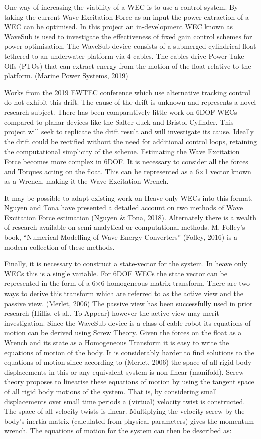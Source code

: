 \documentclass{report}
\begin{document}
One way of increasing the viability of a WEC is to use a control system. By taking the current Wave Excitation Force as an input the power extraction of a WEC can be optimised. In this project an in-development WEC known as WaveSub is used to investigate  the effectiveness of fixed gain control schemes for power optimisation.
The WaveSub device consists of a submerged cylindrical float tethered to an underwater platform via 4 cables. The cables drive Power Take Offs (PTOs) that can extract energy from the motion of the float relative to the platform. (Marine Power Systems, 2019)



Works from the 2019 EWTEC conference which use alternative tracking control do not exhibit this drift. The cause of the drift is unknown and represents a novel research subject. There has been comparatively little work on 6DOF WECs compared to planar devices like the Salter duck and Bristol Cylinder. This project will seek to replicate the drift result and will investigate its cause. Ideally the drift could be rectified without the need for additional control loops, retaining the computational simplicity of the scheme. Estimating the Wave Excitation Force becomes more complex in 6DOF. It is necessary to consider all the forces and Torques acting on the float. This can be represented as a 6×1 vector known as a Wrench, making it the Wave Excitation Wrench.

It may be possible to adapt existing work on Heave only WECs into this format. Nguyen and Tona have presented a detailed account on two methods of Wave Excitation Force estimation (Nguyen \& Tona, 2018). Alternately there is a wealth of research available on semi-analytical or computational methods. M. Folley’s book, “Numerical Modelling of Wave Energy Converters” (Folley, 2016) is a modern collection of these methods.

Finally, it is necessary to construct a state-vector for the system. In heave only WECs this is a single variable. For 6DOF WECs the state vector can be represented in the form of a 6×6 homogeneous matrix transform. There are two ways to derive this transform which are referred to as the active view and the passive view. (Merlet, 2006)
 The passive view has been successfully used in prior research (Hillis, et al., To Appear) however the active view may merit investigation. Since the WaveSub device is a class of cable robot its equations of motion can be derived using Screw Theory.
Given the forces on the float as a Wrench and its state as a Homogeneous Transform it is easy to write the equations of motion of the body. It is considerably harder to find solutions to the equations of motion since according to (Merlet, 2006) the space of all rigid body displacements in this or any equivalent system is non-linear (manifold).
Screw theory proposes to linearise these equations of motion by using the tangent space of all rigid body motions of the system. That is, by considering small displacements over small time periods a (virtual) velocity twist is constructed. The space of all velocity twists is linear.
Multiplying the velocity screw by the body’s inertia matrix (calculated from physical parameters) gives the momentum wrench. The equations of motion for the system can then be described as:
\end{document}
